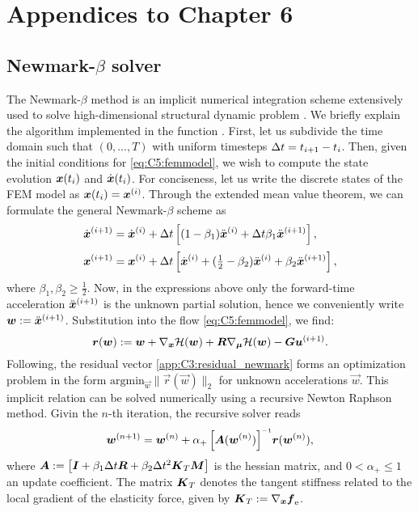 \chapter{Appendices to Chapter 6}
\vspace{-5mm}
\section{Newmark-$\beta$ solver}
\label{app:C5:newmark}
The Newmark-$\beta$ method is an implicit numerical integration scheme extensively used to solve high-dimensional structural dynamic problem \cite{Newmark1959Jul,Holzapfel2002}. We briefly explain the algorithm implemented in the function . First, let us subdivide the time domain such that $(0,...,T)$ with uniform timesteps $\Delta t = t_{i+1} - t_i$. Then, given the initial conditions for \eqref{eq:C5:femmodel}, we wish to compute the state evolution ${\boldsymbol{x}}(t_i)$ and $\dot{{\boldsymbol{x}}}(t_i)$. For conciseness, let us write the discrete states of the FEM model as ${\boldsymbol{x}}(t_i) = {\boldsymbol{x}}^{(i)}$. Through the extended mean value theorem, we can formulate the general Newmark-$\beta$ scheme as
%
\begin{align}
    {\dot{\boldsymbol{x}}}^{(i+1)} & = {\dot{\boldsymbol{x}}}^{(i)} + \Delta t \left[(1-\beta_1)\ddot{\boldsymbol{x}}^{(i)} + \Delta t \beta_1 \ddot{\boldsymbol{x}}^{(i+1)} \right],                        \\[0.2em]
    {{\boldsymbol{x}}}^{(i+1)}  & = {\boldsymbol{x}}^{(i)} + \Delta t\left[ \dot{\boldsymbol{x}}^{(i)} + (\tfrac{1}{2}-\beta_2)\ddot{\boldsymbol{x}}^{(i)} + \beta_2 \ddot{\boldsymbol{x}}^{(i+1)} \right],
\end{align}
%
where $\beta_1,\beta_2 \ge \frac{1}{2}$. Now, in the expressions above only the forward-time acceleration $\ddot{\boldsymbol{x}}^{(i+1)}$ is the unknown partial solution, hence we conveniently write $\boldsymbol{w} := \ddot{{\boldsymbol{x}}}^{(i+1)}$. Substitution into the flow \eqref{eq:C5:femmodel}, we find:
%
\begin{equation}
\boldsymbol{r}(\boldsymbol{w}): = \boldsymbol{w} +\nabla_{{\boldsymbol{x}}}\mathcal{H}(\boldsymbol{w}) + \boldsymbol{R}\nabla_{\boldsymbol{\mu}}\mathcal{H}(\boldsymbol{w}) -  \boldsymbol{G}\boldsymbol{u}^{(i+1)}.
\label{app:C3:residual_newmark}
\end{equation}
%
Following, the residual vector \eqref{app:C3:residual_newmark} forms an optimization problem in the form $\text{argmin}_{\vec{w}} \lVert \vec{r}(\vec{w}) \rVert_2$ for unknown accelerations $\vec{w}$. This implicit relation can be solved numerically using a recursive Newton Raphson method. Givin the $n$-th iteration, the recursive solver reads
%
\begin{equation}
    \vec{w}^{(n+1)} = \vec{w}^{(n)} + \alpha_+ \left[ \mat{A}(\vec{w}^{(n)}) \right]\inv\! \vec{r}(\vec{w}^{(n)}),
    \label{eq:C3:newmark_newtonsolver}
\end{equation}
%
where ${\boldsymbol{A}} := \left[{\boldsymbol{I}} + \beta_1 \Delta t {\boldsymbol{R}}  + \beta_2 \Delta t^2 \boldsymbol{K}_{T}{\boldsymbol{M}}\right]$ is the hessian matrix, and $0< \alpha_+ \le 1$ an update coefficient. The matrix $\boldsymbol{K}_T$ denotes the tangent stiffness related to the local gradient of the elasticity force, given by ${\boldsymbol{K}}_T := \nabla_{{\boldsymbol{x}}} {\boldsymbol{f}}_{\scriptstyle\textrm{e}}$.